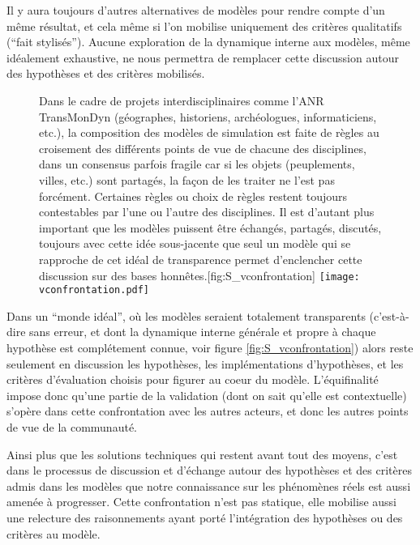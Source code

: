 Il y aura toujours d'autres alternatives de modèles pour rendre compte d'un même résultat, et cela même si l'on mobilise uniquement des critères qualitatifs (\enquote{fait stylisés}). Aucune exploration de la dynamique interne aux modèles, même idéalement exhaustive, ne nous permettra de remplacer cette discussion autour des hypothèses et des critères mobilisés.

\begin{figure}[htbp]
\begin{sidecaption}[fortoc]{Dans le cadre de projets interdisciplinaires comme l'ANR TransMonDyn (géographes, historiens, archéologues, informaticiens, etc.), la composition des modèles de simulation est faite de règles au croisement des différents points de vue de chacune des disciplines, dans un consensus parfois fragile car si les objets (peuplements, villes, etc.) sont partagés, la façon de les traiter ne l'est pas forcément. Certaines règles ou choix de règles restent toujours contestables par l’une ou l’autre des disciplines. Il est d’autant plus important que les modèles puissent être échangés, partagés, discutés, toujours avec cette idée sous-jacente que seul un modèle qui se rapproche de cet idéal de transparence permet d’enclencher cette discussion sur des bases honnêtes.}[fig:S_vconfrontation]
  \centering
 \texttt{[image: vconfrontation.pdf]}
  \end{sidecaption}
\end{figure}

Dans un \enquote{monde idéal}, où les modèles seraient totalement transparents (c'est-à-dire sans erreur, et dont la dynamique interne générale et propre à chaque hypothèse est complétement connue, voir figure \ref{fig:S_vconfrontation}) alors reste seulement en discussion les hypothèses, les implémentations d'hypothèses, et les critères d’évaluation choisis pour figurer au coeur du modèle. L’équifinalité impose donc qu’une partie de la validation (dont on sait qu’elle est contextuelle) s'opère dans cette confrontation avec les autres acteurs, et donc les autres points de vue de la communauté.

Ainsi plus que les solutions techniques qui restent avant tout des moyens, c'est dans le processus de discussion et d'échange autour des hypothèses et des critères admis dans les modèles que notre connaissance sur les phénomènes réels est aussi amenée à progresser. Cette confrontation n'est pas statique, elle mobilise aussi une relecture des raisonnements ayant porté l'intégration des hypothèses ou des critères au modèle. %


